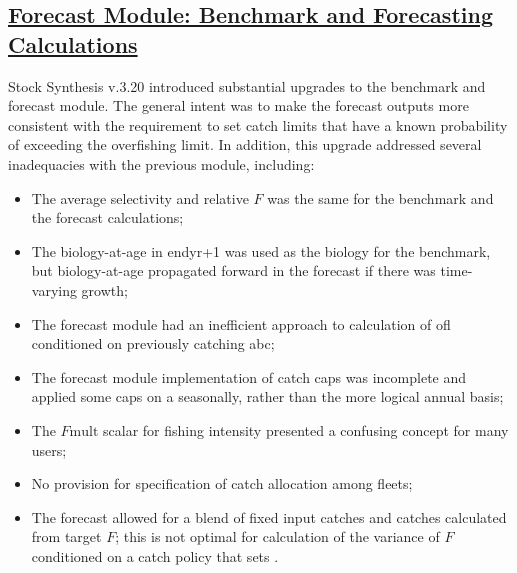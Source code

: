 \hypertarget{appendB}{}
\subsection[Forecast Module: Benchmark and Forecasting Calculations]{\protect\hyperlink{appendB}{Forecast Module: Benchmark and Forecasting Calculations}}\label{sec:forecast}

Stock Synthesis v.3.20 introduced substantial upgrades to the benchmark and forecast module. The general intent was to make the forecast outputs more consistent with the requirement to set catch limits that have a known probability of exceeding the overfishing limit. In addition, this upgrade addressed several inadequacies with the previous module, including:

\begin{itemize}
	\item The average selectivity and relative $F$ was the same for the benchmark and the forecast calculations;
	\item The biology-at-age in endyr+1 was used as the biology for the benchmark, but biology-at-age propagated forward in the forecast if there was time-varying growth;
	\item The forecast module had an inefficient approach to calculation of \gls{ofl} conditioned on previously catching \gls{abc};
	\item The forecast module implementation of catch caps was incomplete and applied some caps on a seasonally, rather than the more logical annual basis;
	\item The $F\text{mult}$ scalar for fishing intensity presented a confusing concept for many users;
	\item No provision for specification of catch allocation among fleets;
	\item The forecast allowed for a blend of fixed input catches and catches calculated from target $F$; this is not optimal for calculation of the variance of $F$ conditioned on a catch policy that sets .
\end{itemize}

